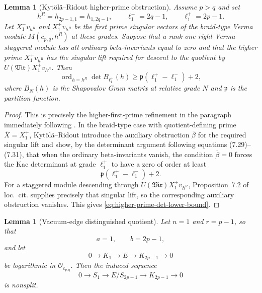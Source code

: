 \documentclass[12pt,leqno]{amsart}
\numberwithin{equation}{section}
\newtheorem{lem}[thm]{Lemma}
\newcommand{\Vir}{\mathfrak{Vir}}
\newcommand{\Oc}{\mathcal O}
\begin{document}
\begin{lem}[Kyt\"ol\"a--Ridout higher-prime obstruction]
\label{lem:higher-prime-determinant}
Assume $p>q$ and set
\[
 h^R=h_{2p-1,1}=h_{1,2q-1},\qquad
 \ell^-_1=2q-1,\qquad \ell^+_1=2p-1.
\]
Let $X^-_1v_{h^R}$ and $X^+_1v_{h^R}$ be the first prime singular
vectors of the braid-type Verma module $M(c_{p,q},h^R)$ at these
grades.  Suppose that a rank-one right-Verma staggered module has all
ordinary beta-invariants equal to zero and that the higher prime
$X^+_1v_{h^R}$ has the singular lift required for descent to the
quotient by $U(\Vir)X^+_1v_{h^R}$.  Then
\begin{equation}\label{eq:higher-prime-det-lower-bound}
 \operatorname{ord}_{h=h^R}\det B_{\ell^+_1}(h)
 \ge
 \mathfrak p(\ell^+_1-\ell^-_1)+2,
\end{equation}
where $B_N(h)$ is the Shapovalov Gram matrix at relative grade $N$ and
$\mathfrak p$ is the partition function.
\end{lem}

\begin{proof}
This is precisely the higher-first-prime refinement in the paragraph
immediately following \cite[Proposition~7.5]{KytolaRidout}.  In the
braid-type case with quotient-defining prime
$\overline X=X^+_1$, Kyt\"ol\"a--Ridout introduce the auxiliary
obstruction $\overline\beta$ for the required singular lift and show,
by the determinant argument following equations (7.29)--(7.31), that
when the ordinary beta-invariants vanish, the condition
$\overline\beta=0$ forces the Kac determinant at grade $\ell^+_1$ to
have a zero of order at least
\[
 \mathfrak p(\ell^+_1-\ell^-_1)+2.
\]
For a staggered module descending through
$U(\Vir)X^+_1v_{h^R}$, Proposition~7.2 of loc.~cit. supplies precisely
that singular lift, so the corresponding auxiliary obstruction
vanishes.  This gives \eqref{eq:higher-prime-det-lower-bound}.
\end{proof}

\begin{lem}[Vacuum-edge distinguished quotient]
\label{lem:vacuum-edge-staggered}
Let $n=1$ and $r=p-1$, so that
\[
 a=1,\qquad b=2p-1,
\]
and let
\[
 0\longrightarrow K_1\longrightarrow E\longrightarrow K_{2p-1}
 \longrightarrow0
\]
be logarithmic in $\Oc_{c_{p,q}}$.  Then the induced sequence
\begin{equation}\label{eq:vacuum-edge-quotient}
 0\longrightarrow S_1\longrightarrow E/S_{2p-1}
 \longrightarrow K_{2p-1}\longrightarrow0
\end{equation}
is nonsplit.
\end{lem}
\end{document}
